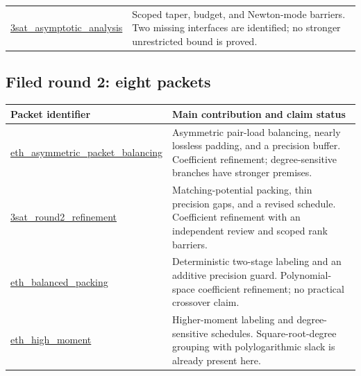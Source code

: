 \begin{longtable}{>{\raggedright\arraybackslash}p{4.9cm}>{\raggedright\arraybackslash}p{10cm}}
\href{https://github.com/VladimirReshetnikov/ProveIt/tree/8e76d515063c4b9fbd8743a846b457e3a01bc039/Computability/SubexponentialSAT/Research/3sat_asymptotic_analysis}{\textsf{3sat\_\allowbreak asymptotic\_\allowbreak analysis}} & Scoped taper, budget, and Newton-mode barriers. Two missing interfaces are identified; no stronger unrestricted bound is proved.\\[3pt]
\end{longtable}

\subsection*{Filed round 2: eight packets}
\begin{longtable}{>{\raggedright\arraybackslash}p{4.9cm}>{\raggedright\arraybackslash}p{10cm}}
\toprule Packet identifier & Main contribution and claim status\\
\midrule\endhead
\bottomrule\endfoot
\href{https://github.com/VladimirReshetnikov/ProveIt/tree/8e76d515063c4b9fbd8743a846b457e3a01bc039/Computability/SubexponentialSAT/Research/eth_asymmetric_packet_balancing}{\textsf{eth\_\allowbreak asymmetric\_\allowbreak packet\_\allowbreak balancing}} & Asymmetric pair-load balancing, nearly lossless padding, and a precision buffer. Coefficient refinement; degree-sensitive branches have stronger premises.\\[3pt]
\href{https://github.com/VladimirReshetnikov/ProveIt/tree/8e76d515063c4b9fbd8743a846b457e3a01bc039/Computability/SubexponentialSAT/Research/3sat_round2_refinement}{\textsf{3sat\_\allowbreak round2\_\allowbreak refinement}} & Matching-potential packing, thin precision gaps, and a revised schedule. Coefficient refinement with an independent review and scoped rank barriers.\\[3pt]
\href{https://github.com/VladimirReshetnikov/ProveIt/tree/8e76d515063c4b9fbd8743a846b457e3a01bc039/Computability/SubexponentialSAT/Research/eth_balanced_packing}{\textsf{eth\_\allowbreak balanced\_\allowbreak packing}} & Deterministic two-stage labeling and an additive precision guard. Polynomial-space coefficient refinement; no practical crossover claim.\\[3pt]
\href{https://github.com/VladimirReshetnikov/ProveIt/tree/8e76d515063c4b9fbd8743a846b457e3a01bc039/Computability/SubexponentialSAT/Research/eth_high_moment}{\textsf{eth\_\allowbreak high\_\allowbreak moment}} & Higher-moment labeling and degree-sensitive schedules. Square-root-degree grouping with polylogarithmic slack is already present here.\\[3pt]

\end{longtable}
